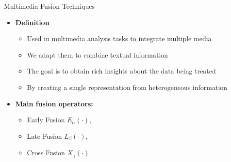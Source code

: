 \documentclass[10pt,=table]{beamer}
\begin{document}
      
\begin{frame}{Multimedia Fusion Techniques}
\vfill
\begin{itemize}
\item<1-> \large \textbf{Definition}
	\begin{itemize}
	\item<1-> Used in multimedia analysis tasks to integrate multiple media 
	\item<1-> We adapt them to combine textual information

	\item<1-> The goal is to obtain rich insights about the data being treated
	\item<1-> By creating a single representation from heterogeneous information
	\end{itemize}									
\vfill	
\item<2-> \large\textbf{Main fusion operators:}
	\begin{itemize}
	\item<2-> Early Fusion $E_\alpha(\cdot)$, 
	\item<2-> Late Fusion $L_\beta(\cdot)$, 
	\item<2-> Cross Fusion $X_\gamma(\cdot)$
	\end{itemize}

\end{itemize}
\hfill
\end{frame}
\end{document}
